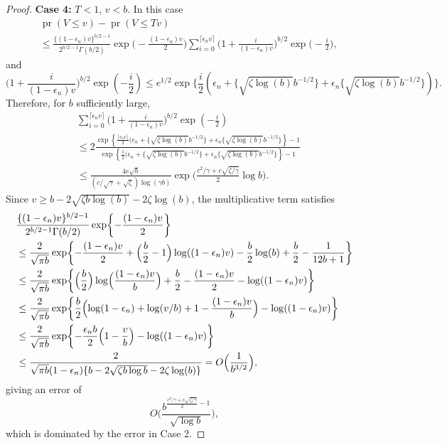 \documentclass[10pt,a4paper]{amsart}
\newcommand{\pr}{\mathop{\mathrm{pr}}}
\begin{document}
\begin{proof}
	\noindent \textbf{Case 4:} $T < 1$, $v < b$. In this case 
	\begin{align*}
		&\pr( V \leq v) - \pr(V \leq Tv) \\
		&\leq \frac{\{(1 -\epsilon_n)v\}^{b/2-1}}{2^{b/2 -1}\Gamma(b/2)} \exp\biggl( -\frac{ (1 -\epsilon_n)v }{2} \biggr) \sum^{ \lceil \epsilon_n v \rceil}_{  i = 0}  \biggl(1+ \frac{i}{(1 -\epsilon_n)v} \biggr)^{b/2} \exp\biggl(- \frac{i}{2} \biggr),
	\end{align*}
	and
	\[
	\biggl(1+ \frac{i}{(1 -\epsilon_n)v} \biggr)^{b/2} \exp\left(- \frac{i}{2} \right) \leq e^{1/2}\exp\biggl\{\frac{i}{2} (\epsilon_n + \{\sqrt{\zeta\log(b)}b^{-1/2}\} + \epsilon_n\{\sqrt{\zeta\log(b)}b^{-1/2}\})\biggr\}.
	\]
	Therefore,  for $b$ sufficiently large,
	\begin{align*}
		&\sum^{ \lceil \epsilon_n v \rceil}_{  i = 0}  \biggl(1+ \frac{i}{(1 -\epsilon_n)v} \biggr)^{b/2} \exp\left(- \frac{i}{2} \right) \\
		&\leq 2 \frac{  \exp\left\{ \frac{\lceil \epsilon_n v \rceil}{2} (\epsilon_n + \{\sqrt{\zeta\log(b)}b^{-1/2}\} + \epsilon_n\{\sqrt{\zeta\log(b)}b^{-1/2}\}  \right\} -1}{\exp\left\{ \frac{1}{2} (\epsilon_n + \{\sqrt{\zeta\log(b)}b^{-1/2}\} + \epsilon_n\{\sqrt{\zeta\log(b)}b^{-1/2}\} \right\} - 1} \\
		&\leq \frac{4e\sqrt{b}}{( c/\sqrt{\gamma} +\sqrt{\zeta})\log(\gamma b)} \exp\biggl( \frac{c^2/\gamma + c\sqrt{\zeta/\gamma} }{2} \log b \biggr).
	\end{align*}
	Since $v \geq b - 2\sqrt{\zeta b\log(b)} - 2\zeta\log(b)$, the multiplicative term satisfies
	\begin{align*}
		&\frac{\{(1 -\epsilon_n)v\}^{b/2-1}}{2^{b/2 -1}\Gamma(b/2)} \exp\biggl\{-\frac{ (1 -\epsilon_n)v }{2} \biggr\} \\
		&\leq  \frac{2}{\sqrt{\pi b}} \exp\biggl\{-\frac{(1 - \epsilon_n)v}{2} + \Bigl(\frac{b}{2} - 1\Bigr) \log( (1- \epsilon_n)v ) - \frac{b}{2}\log(b) + \frac{b}{2} - \frac{1}{12b + 1}  \biggr\}\\
		&\leq \frac{2}{\sqrt{\pi b}} \exp\biggl\{ \Bigl(\frac{b}{2}\Bigr) \log\Bigl(\frac{(1- \epsilon_n)v}{b} \Bigr) +  \frac{b}{2} -\frac{(1 - \epsilon_n)v}{2} - \log((1-\epsilon_n)v) \biggr\}\\
		&\leq \frac{2}{\sqrt{\pi b}} \exp\biggl\{ \frac{b}{2}\Bigl( \log(1 - \epsilon_n) + \log(v/b) + 1 - \frac{(1-\epsilon_n)v}{b}\Bigr) - \log( (1- \epsilon_n)v )   \biggr\}\\
		&\leq\frac{2}{\sqrt{\pi b}} \exp\biggl\{ -\frac{\epsilon_n b}{2} \Bigl(1 - \frac{v}{b} \Bigr) - \log( (1- \epsilon_n)v )  \biggr\}\\
		&\leq \frac{2}{\sqrt{\pi b}(1-\epsilon_n)\{b - 2\sqrt{\zeta b\log b} - 2\zeta\log(b)\} }  = O\Bigl( \frac{1}{b^{3/2}} \Bigr),
	\end{align*}
	giving an error of
	\[
	O\biggl( \frac{b^{\frac{c^2/\gamma + c\sqrt{\zeta/\gamma} }{2} - 1}}{\sqrt{\log b}}  \biggr),
	\]
	which is dominated by the error in Case 2.
\end{proof}
\end{document}
